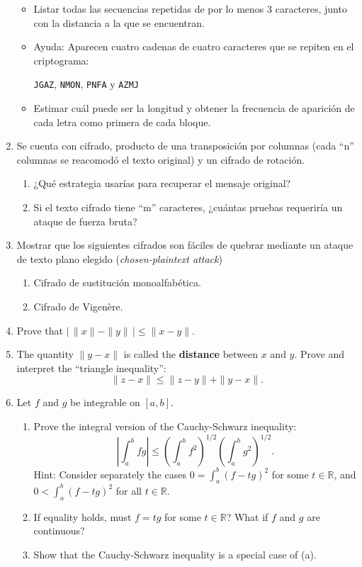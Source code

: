\documentclass[]{book}
\theoremstyle{definition}
\newcommand{\bb}[1]{\mathbb{#1}}
\newcommand{\R}{\bb{R}}
\newcommand{\textdf}[1]{\textbf{\textsf{#1}}\index{#1}}
\newcommand{\ds}{\displaystyle}
\begin{document}
\begin{enumerate}
\begin{itemize}
  \item Listar todas las secuencias repetidas de por lo menos 3 caracteres, junto con la distancia a la que se encuentran. 
  \item Ayuda: Aparecen cuatro cadenas de cuatro caracteres que se repiten en el criptograma: 
      \begin{center}
      \verb+JGAZ+, \verb+NMON+, \verb+PNFA+ y \verb+AZMJ+
      \end{center}
  \item Estimar cuál puede ser la longitud y obtener la frecuencia de aparición de cada letra como primera de cada bloque. 
  \end{itemize}

\item Se cuenta con cifrado, producto de una transposición por columnas
  (cada ``n'' columnas se reacomodó el texto original) y un cifrado de rotación. 
  \begin{enumerate}
    \item ¿Qué estrategia usarías para recuperar el mensaje original? 
    \item Si el texto cifrado tiene ``m'' caracteres, ¿cuántas pruebas requeriría un ataque de fuerza bruta? 
  \end{enumerate}

\item Mostrar que los siguientes cifrados son fáciles de quebrar mediante un
  ataque de texto plano elegido (\textit{chosen-plaintext attack})
  \begin{enumerate}
    \item Cifrado de sustitución monoalfabética.
    \item Cifrado de Vigenère.
  \end{enumerate}

\item	Prove that $\ds \bigg| \, \|x\|-\|y\| \, \bigg| \leq \|x-y\|$.

\item	The quantity $\|y-x\|$ is called the \textdf{distance} between $x$ and
$y$.  Prove and interpret the ``triangle inequality'':
$$\|z-x\| \leq \|z-y\| + \|y-x\|.$$

\item\label{caushw}	Let $f$ and $g$ be integrable on $[a,b]$.
\begin{enumerate}
	\item	Prove the integral version of the Cauchy-Schwarz inequality:
	$$\left|\int_a^b fg\right| \leq \left(\int_a^b
	f^2\right)^{1/2}\left(\int_a^b g^2\right)^{1/2}.$$
	Hint:  Consider separately the cases $0 = \int_a^b(f-t g)^2$ for
	some $t\in\R$, and $0<\int_a^b(f-t g)^2$ for all
	$t\in\R$.
	\item	If equality holds, must $f=t g$ for some $t\in\R$? 
	What if $f$ and $g$ are continuous?
	\item	Show that the Cauchy-Schwarz inequality is a special case of
	(a).


\end{enumerate}
\end{enumerate}
\end{document}
